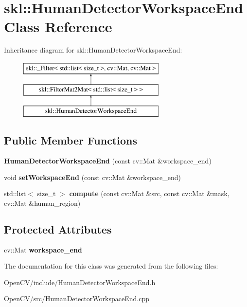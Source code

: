 \hypertarget{classskl_1_1_human_detector_workspace_end}{}\section{skl\+:\+:Human\+Detector\+Workspace\+End Class Reference}
\label{classskl_1_1_human_detector_workspace_end}
Inheritance diagram for skl\+:\+:Human\+Detector\+Workspace\+End\+:\begin{figure}[H]
\begin{center}
\leavevmode
\includegraphics[height=3.000000cm]{classskl_1_1_human_detector_workspace_end}
\end{center}
\end{figure}
\subsection*{Public Member Functions}
\begin{DoxyCompactItemize}
\item 
\hypertarget{classskl_1_1_human_detector_workspace_end_a81308660a9fba4b4e85ce182a7e319b4}{}\label{classskl_1_1_human_detector_workspace_end_a81308660a9fba4b4e85ce182a7e319b4} 
{\bfseries Human\+Detector\+Workspace\+End} (const cv\+::\+Mat \&workspace\+\_\+end)
\item 
\hypertarget{classskl_1_1_human_detector_workspace_end_af2ce04d4506038af6c46ece4e527a2d5}{}\label{classskl_1_1_human_detector_workspace_end_af2ce04d4506038af6c46ece4e527a2d5} 
void {\bfseries set\+Workspace\+End} (const cv\+::\+Mat \&workspace\+\_\+end)
\item 
\hypertarget{classskl_1_1_human_detector_workspace_end_a8ef7d03cf0962270f4d87e5771e3cd9c}{}\label{classskl_1_1_human_detector_workspace_end_a8ef7d03cf0962270f4d87e5771e3cd9c} 
std\+::list$<$ size\+\_\+t $>$ {\bfseries compute} (const cv\+::\+Mat \&src, const cv\+::\+Mat \&mask, cv\+::\+Mat \&human\+\_\+region)
\end{DoxyCompactItemize}
\subsection*{Protected Attributes}
\begin{DoxyCompactItemize}
\item 
\hypertarget{classskl_1_1_human_detector_workspace_end_ae55e80388c04d082c8b4727d0bb825bf}{}\label{classskl_1_1_human_detector_workspace_end_ae55e80388c04d082c8b4727d0bb825bf} 
cv\+::\+Mat {\bfseries workspace\+\_\+end}
\end{DoxyCompactItemize}


The documentation for this class was generated from the following files\+:\begin{DoxyCompactItemize}
\item 
Open\+C\+V/include/Human\+Detector\+Workspace\+End.\+h\item 
Open\+C\+V/src/Human\+Detector\+Workspace\+End.\+cpp\end{DoxyCompactItemize}
